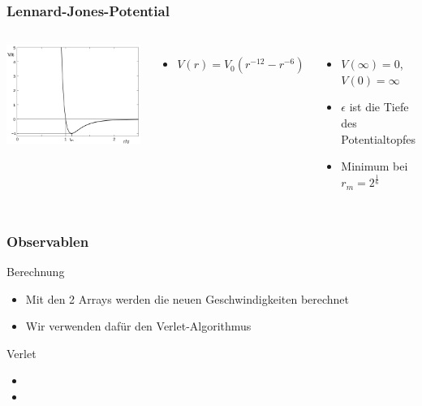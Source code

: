 \documentclass[11pt]{beamer}
\begin{document}
\begin{frame}
  \frametitle{Lennard-Jones-Potential}
   \vspace{-0.3cm}
  \begin{columns}
                \includegraphics[width=\textwidth]{img/LennardJonesPotential.png}
                \begin{itemize}
                \item ${V(r)=V_0 (r^{-12}-r^{-6})}$ %
                \end{itemize}
        \pause
                \begin{itemize}
                \item $V(\infty)=0$, $V(0)=\infty$
                \item $\epsilon$ ist die Tiefe des Potentialtopfes
      			\item Minimum bei $r_{m}=2^{\frac{1}{6}}$ %
    			\end{itemize}
  \end{columns}
\end{frame}

\begin{frame}
  \frametitle{Observablen}
  \begin{block}{Berechnung}
    \begin{itemize}
      \item Mit den 2 Arrays werden die neuen Geschwindigkeiten berechnet
      \item Wir verwenden dafür den Verlet-Algorithmus
    \end{itemize}
  \end{block}
  \pause
   \begin{block}{Verlet}
    \begin{itemize}
      \item 
      \item 
    \end{itemize}
  \end{block}
\end{frame}
\end{document}
